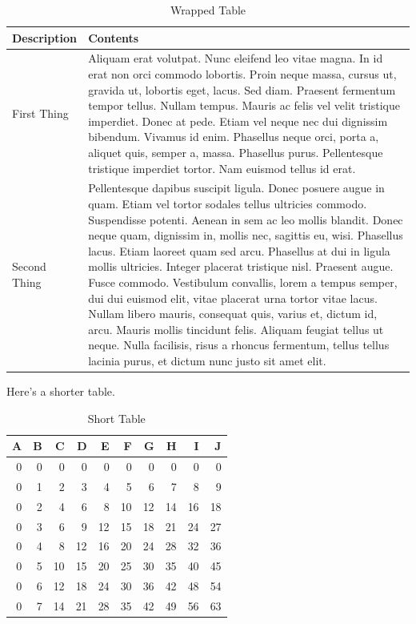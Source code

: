 \documentclass[11pt]{article}
\begin{document}
\begin{table}[htbp]
\caption{Wrapped Table}
\centering
\begin{tabular}{ll}
Description & Contents\\
\hline
First Thing & Aliquam erat volutpat.  Nunc eleifend leo vitae magna.  In id erat non orci commodo lobortis.  Proin neque massa, cursus ut, gravida ut, lobortis eget, lacus.  Sed diam.  Praesent fermentum tempor tellus.  Nullam tempus.  Mauris ac felis vel velit tristique imperdiet.  Donec at pede.  Etiam vel neque nec dui dignissim bibendum.  Vivamus id enim.  Phasellus neque orci, porta a, aliquet quis, semper a, massa.  Phasellus purus.  Pellentesque tristique imperdiet tortor.  Nam euismod tellus id erat.\\
Second Thing & Pellentesque dapibus suscipit ligula.  Donec posuere augue in quam.  Etiam vel tortor sodales tellus ultricies commodo.  Suspendisse potenti.  Aenean in sem ac leo mollis blandit.  Donec neque quam, dignissim in, mollis nec, sagittis eu, wisi.  Phasellus lacus.  Etiam laoreet quam sed arcu.  Phasellus at dui in ligula mollis ultricies.  Integer placerat tristique nisl.  Praesent augue.  Fusce commodo.  Vestibulum convallis, lorem a tempus semper, dui dui euismod elit, vitae placerat urna tortor vitae lacus.  Nullam libero mauris, consequat quis, varius et, dictum id, arcu.  Mauris mollis tincidunt felis.  Aliquam feugiat tellus ut neque.  Nulla facilisis, risus a rhoncus fermentum, tellus tellus lacinia purus, et dictum nunc justo sit amet elit.\\
\end{tabular}
\end{table}

Here's a shorter table.

\begin{table}[htbp]
\caption{Short Table}
\centering
\begin{tabular}{rrrrrrrrrr}
A & B & C & D & E & F & G & H & I & J\\
\hline
0 & 0 & 0 & 0 & 0 & 0 & 0 & 0 & 0 & 0\\
0 & 1 & 2 & 3 & 4 & 5 & 6 & 7 & 8 & 9\\
0 & 2 & 4 & 6 & 8 & 10 & 12 & 14 & 16 & 18\\
0 & 3 & 6 & 9 & 12 & 15 & 18 & 21 & 24 & 27\\
0 & 4 & 8 & 12 & 16 & 20 & 24 & 28 & 32 & 36\\
0 & 5 & 10 & 15 & 20 & 25 & 30 & 35 & 40 & 45\\
0 & 6 & 12 & 18 & 24 & 30 & 36 & 42 & 48 & 54\\
0 & 7 & 14 & 21 & 28 & 35 & 42 & 49 & 56 & 63\\
\end{tabular}
\end{table}
\end{document}
